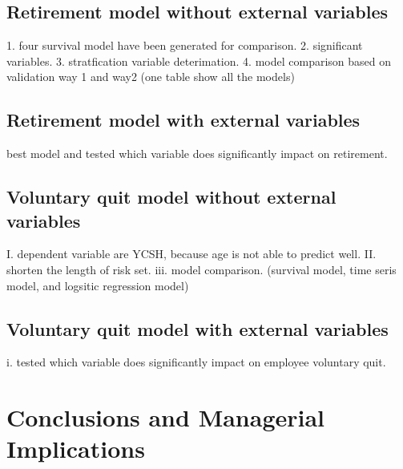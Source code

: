\documentclass[12pt,letterpaper]{article}
\begin{document}
%

\subsection{Retirement model without external variables}
   1. four survival model have been generated for comparison.
   2. significant variables.
   3. stratfication variable deterimation.
   4. model comparison based on validation way 1 and way2 (one table show all the models)
\subsection{Retirement model with external variables}
     best model and tested which variable does significantly impact on retirement.
\subsection{Voluntary quit model without external variables}
     I. dependent variable are YCSH, because age is not able to predict well.
     II. shorten the length of risk set.
     iii. model comparison. (survival model, time seris model, and logsitic regression model)
\subsection{Voluntary quit model with external variables}
    i. tested which variable does significantly impact on employee voluntary quit.


\section{Conclusions and Managerial Implications} 


	
\end{document}
